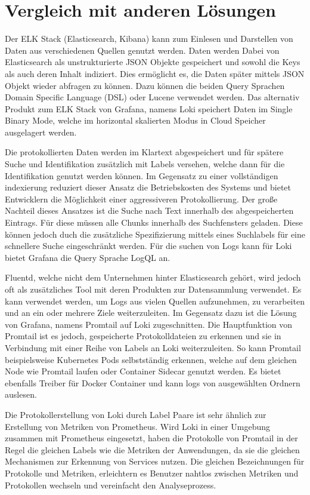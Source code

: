 \section{Vergleich mit anderen Lösungen}
Der ELK Stack (Elasticsearch, Kibana) kann zum Einlesen und Darstellen von Daten aus verschiedenen Quellen genutzt werden.
Daten werden Dabei von Elasticsearch als unstrukturierte JSON Objekte gespeichert und sowohl die Keys als auch deren Inhalt indiziert.
Dies ermöglicht es, die Daten später mittels JSON Objekt wieder abfragen zu können. Dazu können die beiden Query Sprachen Domain Specific Language (DSL) oder Lucene verwendet werden.
Das alternativ Produkt zum ELK Stack von Grafana, namens Loki speichert Daten im Single Binary Mode, welche im horizontal skalierten Modus in Cloud Speicher ausgelagert werden. 
\cite{GrafanaL66:online}


Die protokollierten Daten werden im Klartext abgespeichert und für spätere Suche und Identifikation zusätzlich mit Labels versehen, welche dann für die Identifikation genutzt werden können. 
Im Gegensatz zu einer vollständigen indexierung reduziert dieser Ansatz die Betriebskosten des Systems und bietet Entwicklern die Möglichkeit einer aggressiveren Protokollierung. 
Der große Nachteil dieses Ansatzes ist die Suche nach Text innerhalb des abgespeicherten Eintrags. 
Für diese müssen alle Chunks innerhalb des Suchfensters geladen. 
Diese können jedoch duch die zusätzliche Spezifizierung mittels eines Suchlabels für eine schnellere Suche eingeschränkt werden.
Für die suchen von Logs kann für Loki bietet Grafana die Query Sprache LogQL an.
\cite{Comparis37:online}



Fluentd, welche nicht dem Unternehmen hinter Elasticsearch gehört, wird jedoch oft als zusätzliches Tool mit deren Produkten zur Datensammlung verwendet. 
Es kann verwendet werden, um Logs aus vielen Quellen aufzunehmen, zu verarbeiten und an ein oder mehrere Ziele weiterzuleiten.
Im Gegensatz dazu ist die Lösung von Grafana, namens Promtail auf Loki zugeschnitten. 
Die Hauptfunktion von Promtail ist es jedoch, gespeicherte Protokolldateien zu erkennen und sie in Verbindung mit einer Reihe von Labels an Loki weiterzuleiten. 
So kann Promtail beispielsweise Kubernetes Pods selbstständig erkennen, welche auf dem gleichen Node wie Promtail laufen oder Container Sidecar genutzt werden.
Es bietet ebenfalls Treiber für Docker Container und kann logs von ausgewählten Ordnern auslesen. 

Die Protokollerstellung von Loki durch Label Paare ist sehr ähnlich zur Erstellung von Metriken von Prometheus. 
Wird Loki in einer Umgebung zusammen mit Prometheus eingesetzt, haben die Protokolle von Promtail in der Regel die gleichen Labels wie die Metriken der Anwendungen, da sie die gleichen Mechanismen zur Erkennung von Services nutzen. 
Die gleichen Bezeichnungen für Protokolle und Metriken, erleichtern es Benutzer nahtlos zwischen Metriken und Protokollen wechseln und vereinfacht den Analyseprozess.
\cite{Comparis37:online}



